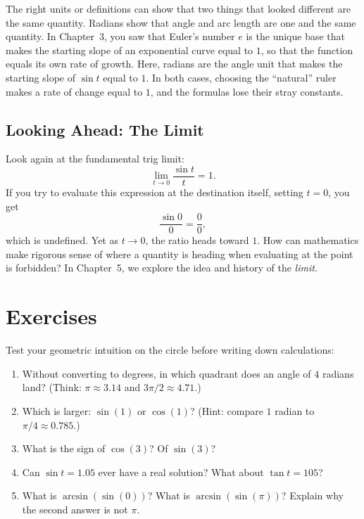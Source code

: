 \begin{aestheticbox}
The right units or definitions can show that two things that looked different are the same quantity. Radians show that angle and arc length are one and the same quantity. In Chapter~3, you saw that Euler's number $e$ is the unique base that makes the starting slope of an exponential curve equal to $1$, so that the function equals its own rate of growth. Here, radians are the angle unit that makes the starting slope of $\sin t$ equal to $1$. In both cases, choosing the ``natural'' ruler makes a rate of change equal to $1$, and the formulas lose their stray constants.
\end{aestheticbox}

\subsection{Looking Ahead: The Limit}

Look again at the fundamental trig limit:
\[
  \lim_{t\to 0}\frac{\sin t}{t} = 1.
\]
If you try to evaluate this expression at the destination itself, setting $t = 0$, you get
\[
  \frac{\sin 0}{0} = \frac{0}{0},
\]
which is undefined. Yet as $t \to 0$, the ratio heads
toward $1$. How can mathematics make rigorous sense of where a quantity is heading
when evaluating at the point is forbidden? In Chapter~5, we explore the idea and history of the
\emph{limit}.

\section{Exercises}
\label{ch04:exercises}

\begin{exercise}
Test your geometric intuition on the circle before writing down calculations:
\begin{enumerate}[label=(\alph*)]
  \item Without converting to degrees, in which quadrant does an angle of $4$ radians land? (Think: $\pi \approx 3.14$ and $3\pi/2 \approx 4.71$.)
  \item Which is larger: $\sin(1)$ or $\cos(1)$? (Hint: compare $1$ radian to $\pi/4 \approx 0.785$.)
  \item What is the sign of $\cos(3)$? Of $\sin(3)$?
  \item Can $\sin t = 1.05$ ever have a real solution? What about $\tan t = 105$?
  \item What is $\arcsin(\sin(0))$? What is $\arcsin(\sin(\pi))$? Explain why the second answer is not $\pi$.
\end{enumerate}
\end{exercise}

